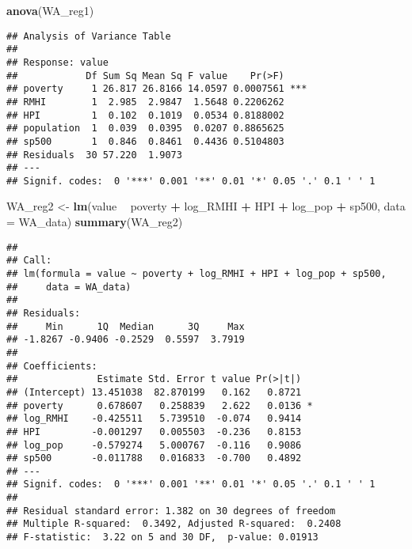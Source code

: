 \documentclass[
]{article}
\newenvironment{Shaded}{\begin{snugshade}}{\end{snugshade}}
\newcommand{\DataTypeTok}[1]{\textcolor[rgb]{0.13,0.29,0.53}{#1}}
\newcommand{\KeywordTok}[1]{\textcolor[rgb]{0.13,0.29,0.53}{\textbf{#1}}}
\newcommand{\NormalTok}[1]{#1}
\newcommand{\OperatorTok}[1]{\textcolor[rgb]{0.81,0.36,0.00}{\textbf{#1}}}
\newcommand{\StringTok}[1]{\textcolor[rgb]{0.31,0.60,0.02}{#1}}
\begin{document}
\begin{Shaded}
\begin{Highlighting}[]
\KeywordTok{anova}\NormalTok{(WA_reg1)}
\end{Highlighting}
\end{Shaded}

\begin{verbatim}
## Analysis of Variance Table
## 
## Response: value
##            Df Sum Sq Mean Sq F value    Pr(>F)    
## poverty     1 26.817 26.8166 14.0597 0.0007561 ***
## RMHI        1  2.985  2.9847  1.5648 0.2206262    
## HPI         1  0.102  0.1019  0.0534 0.8188002    
## population  1  0.039  0.0395  0.0207 0.8865625    
## sp500       1  0.846  0.8461  0.4436 0.5104803    
## Residuals  30 57.220  1.9073                      
## ---
## Signif. codes:  0 '***' 0.001 '**' 0.01 '*' 0.05 '.' 0.1 ' ' 1
\end{verbatim}

\begin{Shaded}
\begin{Highlighting}[]
\NormalTok{WA_reg2 <-}\StringTok{ }\KeywordTok{lm}\NormalTok{(value }\OperatorTok{~}\StringTok{ }\NormalTok{poverty }\OperatorTok{+}\StringTok{ }\NormalTok{log_RMHI }\OperatorTok{+}\StringTok{ }\NormalTok{HPI }\OperatorTok{+}\StringTok{ }\NormalTok{log_pop }\OperatorTok{+}\StringTok{ }\NormalTok{sp500, }\DataTypeTok{data =}\NormalTok{ WA_data)}
\KeywordTok{summary}\NormalTok{(WA_reg2)}
\end{Highlighting}
\end{Shaded}

\begin{verbatim}
## 
## Call:
## lm(formula = value ~ poverty + log_RMHI + HPI + log_pop + sp500, 
##     data = WA_data)
## 
## Residuals:
##     Min      1Q  Median      3Q     Max 
## -1.8267 -0.9406 -0.2529  0.5597  3.7919 
## 
## Coefficients:
##              Estimate Std. Error t value Pr(>|t|)  
## (Intercept) 13.451038  82.870199   0.162   0.8721  
## poverty      0.678607   0.258839   2.622   0.0136 *
## log_RMHI    -0.425511   5.739510  -0.074   0.9414  
## HPI         -0.001297   0.005503  -0.236   0.8153  
## log_pop     -0.579274   5.000767  -0.116   0.9086  
## sp500       -0.011788   0.016833  -0.700   0.4892  
## ---
## Signif. codes:  0 '***' 0.001 '**' 0.01 '*' 0.05 '.' 0.1 ' ' 1
## 
## Residual standard error: 1.382 on 30 degrees of freedom
## Multiple R-squared:  0.3492, Adjusted R-squared:  0.2408 
## F-statistic:  3.22 on 5 and 30 DF,  p-value: 0.01913
\end{verbatim}
\end{document}

